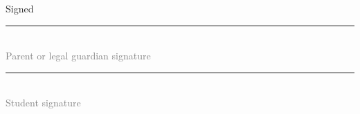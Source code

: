 \documentclass{ross}
\begin{document}
\vspace{0.5in}
\hfill Signed \rule{3in}{0.1mm}\\[-1.5mm]
\hspace*{3.7in} {\footnotesize \textcolor{gray}{Parent or legal guardian signature} }


\vspace{0.5in}

\hfill  \rule{3in}{0.1mm}\\[-1.5mm]
\hspace*{3.7in} {\footnotesize \textcolor{gray}{Student signature} }


\end{document}
